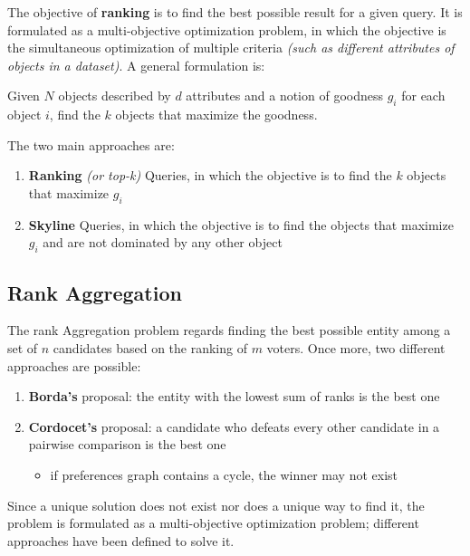 \documentclass[english]{article}
\begin{document}
The objective of \textbf{ranking} is to find the best possible result for a given query.
It is formulated as a multi-objective optimization problem, in which the objective is the simultaneous optimization of multiple criteria \textit{(such as different attributes of objects in a dataset)}.
A general formulation is:

\begin{center}
  Given \(N\) objects described by \(d\) attributes and a notion of goodness \(g_i\) for each object \(i\), find the \(k\) objects that maximize the goodness.
\end{center}

The two main approaches are:

\begin{enumerate}
  \item \textbf{Ranking} \textit{(or top-k)} Queries, in which the objective is to find the \(k\) objects that maximize \(g_i\)
  \item \textbf{Skyline} Queries, in which the objective is to find the objects that maximize \(g_i\) and are not dominated by any other object
\end{enumerate}

\subsection{Rank Aggregation}

The rank Aggregation problem regards finding the best possible entity among a set of \(n\) candidates based on the ranking of \(m\) voters.
Once more, two different approaches are possible:

\begin{enumerate}
  \item \textbf{Borda's} proposal: the entity with the lowest sum of ranks is the best one
  \item \textbf{Cordocet's} proposal: a candidate who defeats every other candidate in a pairwise comparison is the best one
        \begin{itemize}[label=\xmarkthin]
          \item if preferences graph contains a cycle, the winner may not exist
        \end{itemize}
\end{enumerate}

\bigskip
Since a unique solution does not exist nor does a unique way to find it, the problem is formulated as a multi-objective optimization problem;
different approaches have been defined to solve it.
\end{document}
